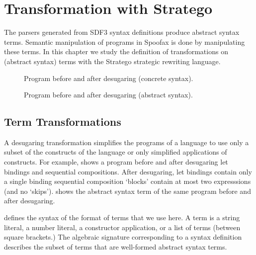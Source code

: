 \chapter{Transformation with Stratego}

The parsers generated from SDF3 syntax definitions produce abstract syntax
terms. Semantic manipulation of programs in Spoofax is done by manipulating
these terms. In this chapter we study the definition of transformations on
(abstract syntax) terms with the Stratego strategic rewriting language.

\begin{figure}[p]
\begin{minipage}[t]{0.47\hsize}

\end{minipage}
\hfill
\begin{minipage}[t]{0.47\hsize}

\end{minipage}
\caption{Program before and after desugaring (concrete syntax).}
\bigskip
{}


\caption{Program before and after desugaring (abstract syntax).}
\end{figure}

\section{Term Transformations}

A desugaring transformation simplifies the programs of a language to use only a
subset of the constructs of the language or only simplified applications of
constructs. 
For example,  shows a program before and after
desugaring let bindings and sequential compositions. After desugaring, let
bindings contain only a single binding sequential composition `blocks' contain
at most two expresssions (and no `skips').
 shows the abstract syntax term of the same
program before and after desugaring.

 defines the syntax of the format of terms that we use here.
A term is a string literal, a number literal, a constructor application, or a
list of terms (between square brackets.)
The algebraic signature corresponding to a syntax definition describes the
subset of terms that are well-formed abstract syntax terms.


